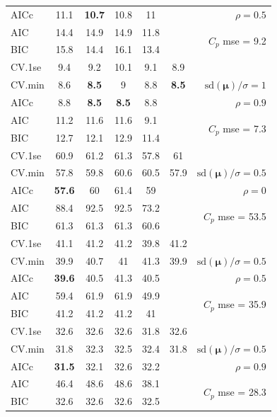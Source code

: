\documentclass[12pt]{article}
\newcommand{\mr}[1]{\mathrm{#1}}
\newcommand{\bm}[1]{\mathbf{#1}}
\begin{document}
\begin{table}[p]
\begin{center}
\begin{tabular}{l*{5}{c}|r}
AICc & 11.1 & {\bf 10.7} & 10.8 & 11 & & $\rho=0.5$ \\
AIC & 14.4 & 14.9 & 14.9 & 11.8 & & \multirow{2}{*}{$C_p$ mse = 9.2} \\
BIC & 15.8 & 14.4 & 16.1 & 13.4 & & \\
 \hline 
CV.1se & 9.4 & 9.2 & 10.1 & 9.1 & 8.9 &\\
CV.min & 8.6 & {\bf 8.5} & 9 & 8.8 & {\bf 8.5} &  $\mr{sd}(\bm{\mu})/\sigma=1$ \\
AICc & 8.8 & {\bf 8.5} & {\bf 8.5} & 8.8 & & $\rho=0.9$ \\
AIC & 11.2 & 11.6 & 11.6 & 9.1 & & \multirow{2}{*}{$C_p$ mse = 7.3} \\
BIC & 12.7 & 12.1 & 12.9 & 11.4 & & \\
 \hline 
CV.1se & 60.9 & 61.2 & 61.3 & 57.8 & 61 &\\
CV.min & 57.8 & 59.8 & 60.6 & 60.5 & 57.9 &  $\mr{sd}(\bm{\mu})/\sigma=0.5$ \\
AICc & {\bf 57.6} & 60 & 61.4 & 59 & & $\rho=0$ \\
AIC & 88.4 & 92.5 & 92.5 & 73.2 & & \multirow{2}{*}{$C_p$ mse = 53.5} \\
BIC & 61.3 & 61.3 & 61.3 & 60.6 & & \\
 \hline 
CV.1se & 41.1 & 41.2 & 41.2 & 39.8 & 41.2 &\\
CV.min & 39.9 & 40.7 & 41 & 41.3 & 39.9 &  $\mr{sd}(\bm{\mu})/\sigma=0.5$ \\
AICc & {\bf 39.6} & 40.5 & 41.3 & 40.5 & & $\rho=0.5$ \\
AIC & 59.4 & 61.9 & 61.9 & 49.9 & & \multirow{2}{*}{$C_p$ mse = 35.9} \\
BIC & 41.2 & 41.2 & 41.2 & 41 & & \\
 \hline 
CV.1se & 32.6 & 32.6 & 32.6 & 31.8 & 32.6 &\\
CV.min & 31.8 & 32.3 & 32.5 & 32.4 & 31.8 &  $\mr{sd}(\bm{\mu})/\sigma=0.5$ \\
AICc & {\bf 31.5} & 32.1 & 32.6 & 32.2 & & $\rho=0.9$ \\
AIC & 46.4 & 48.6 & 48.6 & 38.1 & & \multirow{2}{*}{$C_p$ mse = 28.3} \\
BIC & 32.6 & 32.6 & 32.6 & 32.5 & & \\
 \hline \end{tabular}
\end{center}
\vspace{-1cm}
\end{table}
\end{document}
